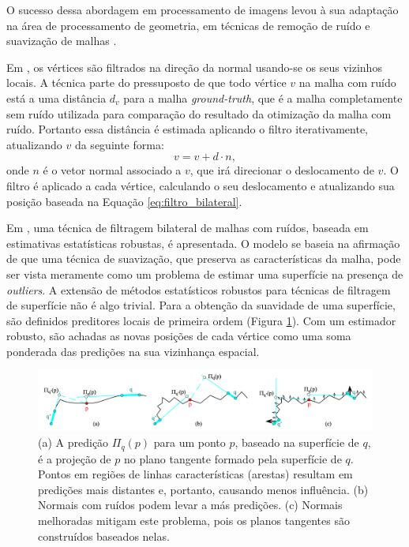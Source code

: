 O sucesso dessa abordagem em processamento de imagens levou à sua adaptação na área de processamento de geometria, em técnicas de remoção de ruído e suavização de malhas \cite{fleishman2003bilateral, jones2003non, zheng2011bilateral, solomon2014general}.

Em \cite{fleishman2003bilateral}, os vértices são filtrados na direção da normal usando-se os seus vizinhos locais. A técnica parte do pressuposto de que todo vértice $v$ na malha com ruído está a uma distância $d_v$ para a malha \textit{ground-truth}, que é a malha completamente sem ruído utilizada para comparação do resultado da otimização da malha com ruído. Portanto essa distância é estimada aplicando o filtro iterativamente, atualizando $v$ da seguinte forma:
\begin{equation}
    v = v + d \cdot n,
\end{equation}
onde $n$ é o vetor normal associado a $v$, que irá direcionar o deslocamento de $v$. O filtro é aplicado a cada vértice, calculando o seu deslocamento e atualizando sua posição baseada na Equação \ref{eq:filtro_bilateral}.

Em \cite{jones2003non}, uma técnica de filtragem bilateral de malhas com ruídos, baseada em estimativas estatísticas robustas, é apresentada. O modelo se baseia na afirmação de que uma técnica de suavização, que preserva as características da malha, pode ser vista meramente como um problema de estimar uma superfície na presença de \textit{outliers}. A extensão de métodos estatísticos robustos para técnicas de filtragem de superfície não é algo trivial. Para a obtenção da suavidade de uma superfície, são definidos preditores locais de primeira ordem (Figura \ref{fig:predictions}). Com um estimador robusto, são achadas as novas posições de cada vértice como uma soma ponderada das predições na sua vizinhança espacial.


\begin{figure}[!h]
\captionsetup{width=\linewidth}
\centering
\includegraphics[scale=0.28]{figuras/predictions.png}
\caption{(a) A predição $\Pi_q(p)$ para um ponto $p$, baseado na superfície de $q$, é a projeção de $p$ no plano tangente formado pela superfície de $q$. Pontos em regiões de linhas características (arestas) resultam em predições mais distantes e, portanto, causando menos influência. (b) Normais com ruídos podem levar a más predições. (c) Normais melhoradas mitigam este problema, pois os planos tangentes são construídos baseados nelas. }
\label{fig:predictions}
\end{figure}

